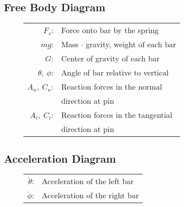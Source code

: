 \documentclass[12pt]{report}
\begin{document}
\begin{flushleft}
\section{Free Body Diagram}
\begin{figure}[ht]
   \begin{minipage}[c]{.225\textwidth}
      
   \end{minipage}%
   \begin{minipage}[c]{.55\textwidth}
     \center
     \begin{tabular}{rl}
     $F_s$:&Force onto bar by the spring\\
     $mg$:&Mass $\cdot$ gravity, weight of each bar\\
     $G$:&Center of gravity of each bar\\
     $\theta,~\phi$:& Angle of bar relative to vertical\\
     $A_n,~C_n$:& Reaction forces in the normal \\ & direction at pin\\
     $A_t,~C_t$:& Reaction forces in the tangential \\ & direction at pin\\
   \end{tabular}
   \end{minipage}%
  \begin{minipage}[c]{.225\textwidth}
    \vspace{2.8ex}
    \hspace{2ex}
     
  \end{minipage}
\end{figure}
\vspace{-3ex}
\subsection{Acceleration Diagram}
\begin{figure}[ht]
   \begin{minipage}[c]{.25\textwidth}
      
   \end{minipage}%
   \begin{minipage}[c]{.5\textwidth}
     \center
     \begin{tabular}{rl}
     $\ddot{\theta}$:& Acceleration of the left bar\\
     $\ddot{\phi}$:& Acceleration of the right bar\\
   \end{tabular}
   \end{minipage}%
  \begin{minipage}[c]{.25\textwidth}
    \hspace{2ex}
     
  \end{minipage}
\end{figure}
\vspace{-5ex}

\end{flushleft}
\end{document}
